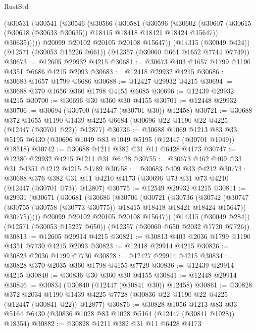 \begin{lexlean}{RustStd}
\begin{coremodule}
    (@30531
      (@30541
        (@30546
          (@30566
            (@30581
              (@30596
                (@30602
                  (@30607 (@30615 (@30618 (@30633 @30635)) @18415 @18418 @18421 @18424 @15647))
                  @30635)))))
        @20099
        @20102
        @20105
        @20108
        @15647))
    (@14315 (@30049 @424))
    (@12571 (@30053 @15226 @661))
    (@12357 (@30060 @661 @1652 @7744 @7749))
@30673 := @12605 @29932 @4215
@30681 := @30673 @403 @1657 @1799 @1190 @4351 @6686 @4215 @2093
@30683 := @12418 @29932 @4215
@30686 := @30683 @1657 @1799 @6686
@30688 := @12427 @29932 @4215
@30694 := @30688 @370 @1656 @360 @1798 @4155 @6685
@30696 := @12439 @29932 @4215
@30700 := @30696 @30 @360 @30 @4155
@30701 := @12448 @29932
@30706 := @30694 (@30700 (@12447 (@30701 @30)) @12458)
@30721 := @30688
    @372
    @1655
    @1190
    @1439
    @4225
    @6684
    (@30696 @22 @1190 @22 @4225 (@12447 (@30701 @22)) @12877)
@30736 := @30688
    @1069
    @1213
    @83
    @33
    @5195
    @6430
    (@30696 @1049 @83 @1049 @5195 (@12447 (@30701 @1049)) @18518)
@30742 := @30688 @1211 @382 @31 @11 @6428 @4173
@30747 := @12380 @29932 @4215 @1211 @31 @6428
@30755 := @30673 @462 @409 @33 @31 @4351 @4212 @4215 @1789
@30758 := @30683 @409 @33 @4212
@30773 := @30688
    @376
    @382
    @31
    @11
    @4210
    @4173
    (@30696 @73 @31 @73 @4210 (@12447 (@30701 @73)) @12807)
@30775 := @12549 @29932 @4215
@30811 := @29931
    (@30671
      (@30681
        (@30686
          (@30706
            (@30721
              (@30736
                (@30742
                  (@30747 (@30755 (@30758 (@30773 @30775)) @18415 @18418 @18421 @18424 @15647))
                  @30775)))))
        @20099
        @20102
        @20105
        @20108
        @15647))
    (@14315 (@30049 @284))
    (@12571 (@30053 @15227 @650))
    (@12357 (@30060 @650 @2032 @7720 @7726))
@30813 := @12605 @29914 @4215
@30821 := @30813 @403 @2036 @1799 @1190 @4351 @7730 @4215 @2093
@30823 := @12418 @29914 @4215
@30826 := @30823 @2036 @1799 @7730
@30828 := @12427 @29914 @4215
@30834 := @30828 @370 @2035 @360 @1798 @4155 @7729
@30836 := @12439 @29914 @4215
@30840 := @30836 @30 @360 @30 @4155
@30841 := @12448 @29914
@30846 := @30834 (@30840 (@12447 (@30841 @30)) @12458)
@30861 := @30828
    @372
    @2034
    @1190
    @1439
    @4225
    @7728
    (@30836 @22 @1190 @22 @4225 (@12447 (@30841 @22)) @12877)
@30876 := @30828
    @1056
    @1213
    @83
    @33
    @5164
    @6430
    (@30836 @1028 @83 @1028 @5164 (@12447 (@30841 @1028)) @18354)
@30882 := @30828 @1211 @382 @31 @11 @6428 @4173

\end{coremodule}
\end{lexlean}
